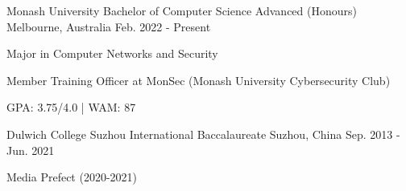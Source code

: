 

\begin{cventries}


    \cventry
    {Monash University}
    {Bachelor of Computer Science Advanced (Honours)}
    {Melbourne, Australia}
    {Feb. 2022 - Present}
    {
        \begin{cvitems}
            \item {Major in Computer Networks and Security}
            \item {Member Training Officer at MonSec (Monash University Cybersecurity Club)}
            \item {GPA: 3.75/4.0 | WAM: 87}
        \end{cvitems}
    }


  \cventry
    {Dulwich College Suzhou} %
    {International Baccalaureate} %
    {Suzhou, China} %
    {Sep. 2013 - Jun. 2021} %
    {
      \begin{cvitems} %
        \item {Media Prefect (2020-2021)}
      \end{cvitems}
    }

\end{cventries}
\vspace{-3.0mm}